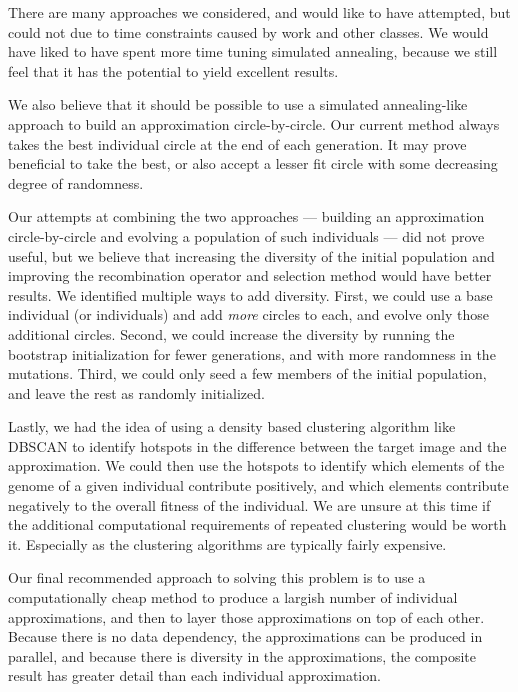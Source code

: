 \documentclass{article}
\begin{document}
There are many approaches we considered, and would like to have attempted, but could not due to
time constraints caused by work and other classes. We would have liked to have spent more time
tuning simulated annealing, because we still feel that it has the potential to yield excellent
results.

We also believe that it should be possible to use a simulated annealing-like approach to build an
approximation circle-by-circle. Our current method always takes the best individual circle at the
end of each generation. It may prove beneficial to take the best, or also accept a lesser fit
circle with some decreasing degree of randomness.

Our attempts at combining the two approaches --- building an approximation circle-by-circle and
evolving a population of such individuals --- did not prove useful, but we believe that increasing
the diversity of the initial population and improving the recombination operator and selection
method would have better results. We identified multiple ways to add diversity. First, we could use
a base individual (or individuals) and add \textit{more} circles to each, and evolve only those
additional circles. Second, we could increase the diversity by running the bootstrap initialization
for fewer generations, and with more randomness in the mutations. Third, we could only seed a few
members of the initial population, and leave the rest as randomly initialized.

Lastly, we had the idea of using a density based clustering algorithm like DBSCAN to identify
hotspots in the difference between the target image and the approximation. We could then use the
hotspots to identify which elements of the genome of a given individual contribute positively, and
which elements contribute negatively to the overall fitness of the individual. We are unsure at
this time if the additional computational requirements of repeated clustering would be worth it.
Especially as the clustering algorithms are typically fairly expensive.

Our final recommended approach to solving this problem is to use a computationally cheap method to
produce a largish number of individual approximations, and then to layer those approximations on
top of each other. Because there is no data dependency, the approximations can be produced in
parallel, and because there is diversity in the approximations, the composite result has greater
detail than each individual approximation.
\end{document}
